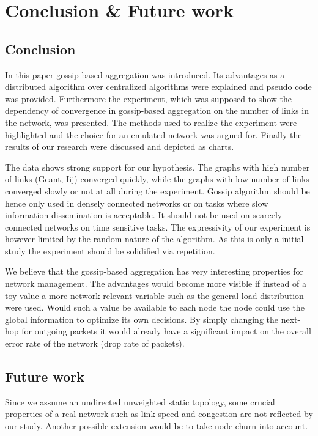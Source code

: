 \section{Conclusion \& Future work}
\label{sec:conclusion}

\subsection{Conclusion}
In this paper gossip-based aggregation was introduced. Its advantages as a distributed algorithm over centralized algorithms were explained and pseudo code was provided. Furthermore the experiment, which was supposed to show the dependency of convergence in gossip-based aggregation on the number of links in the network, was presented. The methods used to realize the experiment were highlighted and the choice for an emulated network was argued for. Finally the results of our research were discussed and depicted as charts.

The data shows strong support for our hypothesis. The graphs with high number of links (Geant, Iij) converged quickly, while the graphs with low number of links converged slowly or not at all during the experiment. Gossip algorithm should be hence only used in densely connected networks or on tasks where slow information dissemination is acceptable. It should not be used on scarcely connected networks on time sensitive tasks. The expressivity of our experiment is however limited by the random nature of the algorithm. As this is only a initial study the experiment should be solidified via repetition.

We believe that the gossip-based aggregation has very interesting properties for network management. The advantages would become more visible if instead of a toy value a more network relevant variable such as the general load distribution were used. Would such a value be available to each node the node could use the global information to optimize its own decisions. By simply changing the next-hop for outgoing packets it would already have a significant impact on the overall error rate of the network (drop rate of packets).

\subsection{Future work}
Since we assume an undirected unweighted static topology, some crucial properties of a real network such as link speed and congestion are not reflected by our study. Another possible extension would be to take node churn into account.


